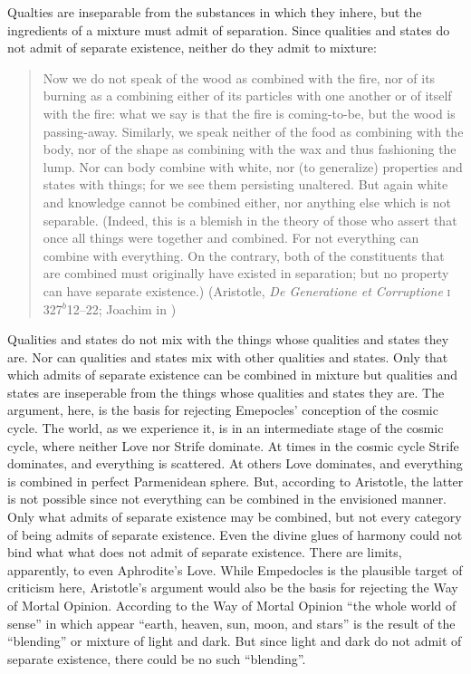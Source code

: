 Qualties are inseparable from the substances in which they inhere, but the ingredients of a mixture must admit of separation. Since qualities and states do not admit of separate existence, neither do they admit to mixture:
\begin{quote}
	Now we do not speak of the wood as combined with the fire, nor of its burning as a combining either of its particles with one another or of itself with the fire: what we say is that the fire is coming-to-be, but the wood is passing-away. Similarly, we speak neither of the food as combining with the body, nor of the shape as combining with the wax and thus fashioning the lump. Nor can body combine with white, nor (to generalize) properties and states with things; for we see them persisting unaltered. But again white and knowledge cannot be combined either, nor anything else which is not separable. (Indeed, this is a blemish in the theory of those who assert that once all things were together and combined. For not everything can combine with everything. On the contrary, both of the constituents that are combined must originally have existed in separation; but no property can have separate existence.) (Aristotle, \emph{De Generatione et Corruptione} \textsc{i} 327\( ^{b} \)12--22; Joachim in \citealt[30--31]{Barnes:1984kx})
\end{quote}
Qualities and states do not mix with the things whose qualities and states they are. Nor can qualities and states mix with other qualities and states. Only that which admits of separate existence can be combined in mixture but qualities and states are inseperable from the things whose qualities and states they are. The argument, here, is the basis for rejecting Emepocles' conception of the cosmic cycle. The world, as we experience it, is in an intermediate stage of the cosmic cycle, where neither Love nor Strife dominate. At times in the cosmic cycle Strife dominates, and everything is scattered. At others Love dominates, and everything is combined in perfect Parmenidean sphere. But, according to Aristotle, the latter is not possible since not everything can be combined in the envisioned manner. Only what admits of separate existence may be combined, but not every category of being admits of separate existence. Even the divine glues of harmony could not bind what what does not admit of separate existence. There are limits, apparently, to even Aphrodite's Love. While Empedocles is the plausible target of criticism here, Aristotle's argument would also be the basis for rejecting the Way of Mortal Opinion. According to the Way of Mortal Opinion “the whole world of sense” in which appear “earth, heaven, sun, moon, and stars” is the result of the ``blending'' or mixture of light and dark. But since light and dark do not admit of separate existence, there could be no such ``blending''. 

